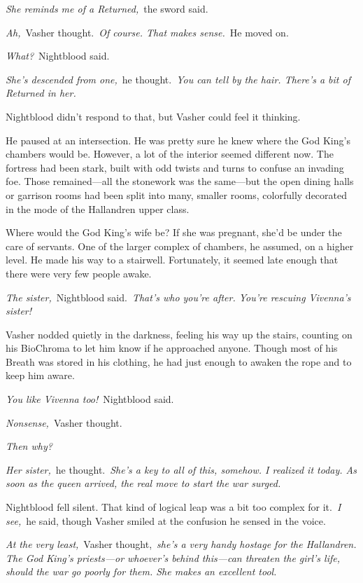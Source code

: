 \textit{She reminds me of a Returned,}~the sword said.

\textit{Ah,}~Vasher thought.~\textit{Of course. That makes sense.}~He moved on.

\textit{What?}~Nightblood said.

\textit{She’s descended from one,}~he thought.~\textit{You can tell by the hair. There’s a bit of Returned in her.}

Nightblood didn’t respond to that, but Vasher could feel it thinking.

He paused at an intersection. He was pretty sure he knew where the God King’s chambers would be. However, a lot of the interior seemed different now. The fortress had been stark, built with odd twists and turns to confuse an invading foe. Those remained—all the stonework was the same—but the open dining halls or garrison rooms had been split into many, smaller rooms, colorfully decorated in the mode of the Hallandren upper class.

Where would the God King’s wife be? If she was pregnant, she’d be under the care of servants. One of the larger complex of chambers, he assumed, on a higher level. He made his way to a stairwell. Fortunately, it seemed late enough that there were very few people awake.

\textit{The sister,}~Nightblood said.~\textit{That’s who you’re after. You’re rescuing Vivenna’s sister!}

Vasher nodded quietly in the darkness, feeling his way up the stairs, counting on his BioChroma to let him know if he approached anyone. Though most of his Breath was stored in his clothing, he had just enough to awaken the rope and to keep him aware.

\textit{You like Vivenna too!}~Nightblood said.

\textit{Nonsense,}~Vasher thought.

\textit{Then why?}

\textit{Her sister,}~he thought.~\textit{She’s a key to all of this, somehow. I realized it today. As soon as the queen arrived, the real move to start the war surged.}

Nightblood fell silent. That kind of logical leap was a bit too complex for it.~\textit{I see,}~he said, though Vasher smiled at the confusion he sensed in the voice.

\textit{At the very least,}~Vasher thought,~\textit{she’s a very handy hostage for the Hallandren. The God King’s priests—or whoever’s behind this—can threaten the girl’s life, should the war go poorly for them. She makes an excellent tool.}

